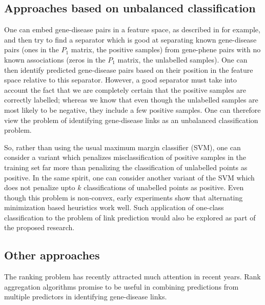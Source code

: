 \subsection{Approaches based on unbalanced classification}
One can embed gene-disease pairs in a feature space, as described in \cite{basilicoHofmann} for example, and then try to find a separator which is good at separating known gene-disease pairs (ones in the $P_1$ matrix, the positive samples) from gene-phene pairs with no known associations (zeros in the $P_1$ matrix, the unlabelled samples). One can then identify predicted gene-disease pairs based on their position in the feature space relative to this separator. However, a good separator must take into account the fact that we are completely certain that the positive samples are correctly labelled; whereas we know that even though the unlabelled samples are most likely to be negative, they include a few positive samples. One can therefore view the problem of identifying gene-disease links as an unbalanced classification problem.

So, rather than using the usual maximum margin classifier (SVM), one can consider a variant which penalizes misclassification of positive samples in the training set far more than penalizing the classification of unlabelled points as positive. In the same spirit, one can consider another variant of the SVM which does not penalize upto $k$ classifications of unabelled points as positive. Even though this problem is non-convex, early experiments show that alternating minimization based heuristics work well. Such application of one-class classification to the problem of link prediction would also be explored as part of the proposed research.

\subsection{Other approaches}
The ranking problem has recently attracted much attention in recent years. Rank aggregation algorithms \cite{rankAggregation} promise to be useful in combining predictions from multiple predictors in identifying gene-disease links.